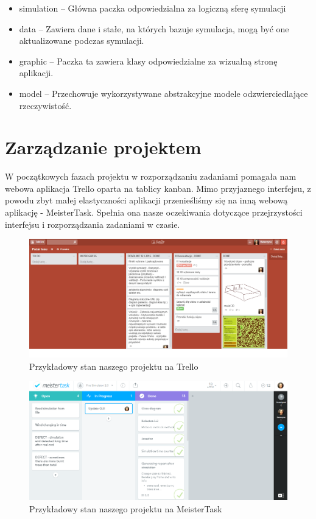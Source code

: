 \documentclass[a4paper, 11pt]{article}
\begin{document}
	\begin{itemize}
		\item simulation -- Główna paczka odpowiedzialna za logiczną sferę symulacji		
		\item data -- Zawiera dane i stałe, na których bazuje symulacja, mogą być one aktualizowane podczas symulacji.
		\item graphic -- Paczka ta zawiera klasy odpowiedzialne za wizualną stronę aplikacji.
		\item model -- Przechowuje wykorzystywane abstrakcyjne modele odzwierciedlające rzeczywistość.
	\end{itemize}
	
	\section{Zarządzanie projektem}
	\indent
	
	W początkowych fazach projektu w rozporządzaniu zadaniami pomagała nam webowa aplikacja Trello oparta na tablicy kanban. Mimo przyjaznego interfejsu, z powodu zbyt małej elastyczności aplikacji przenieśliśmy się na inną webową aplikację - MeisterTask. Spełnia ona nasze oczekiwania dotyczące przejrzystości interfejsu i rozporządzania zadaniami w czasie. \\
	\begin{figure}[H]
		\centerline{\includegraphics[scale=0.4]{pictures/trello.png}}
		\raggedright{	\caption{Przykładowy stan naszego projektu na Trello}}
	\end{figure}
	\begin{figure}[H]
		\centerline{\includegraphics[scale=0.4]{pictures/meister.png}}
		\raggedright{	\caption{Przykładowy stan naszego projektu na MeisterTask}}
	\end{figure}
	
\end{document}
